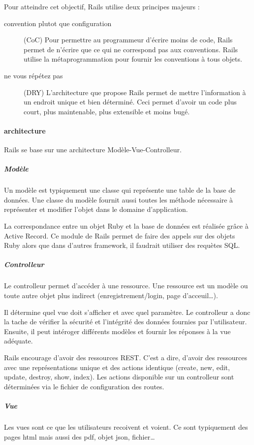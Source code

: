 Pour atteindre cet objectif, Rails utilise deux principes majeurs :
\begin{description}
  \item[convention plutot que configuration] (CoC) Pour permettre au programmeur d'écrire moins de code, Rails permet de n'écrire que ce qui ne correspond pas aux conventions. Rails utilise la métaprogrammation pour fournir les conventions à tous objets.
  \item[ne vous répétez  pas] (DRY) L'architecture que propose Rails permet de mettre l'information à un endroit unique et bien déterminé. Ceci permet d'avoir un code plus court, plus maintenable, plus extensible et moins bugé.
\end{description}

\paragraph{architecture}
Rails se base sur une architecture Modèle-Vue-Controlleur.
\subparagraph{Modèle} 
Un modèle est typiquement une classe qui représente une table de la base de données. Une classe du modèle fournit aussi toutes les méthode nécessaire à représenter et modifier l'objet dans le domaine d'application.

La correspondance entre un objet Ruby et la base de données est réalisée grâce à Active Record. Ce module de Rails permet de faire des appels sur des objets Ruby alors que dans d'autres framework, il faudrait utiliser des requètes SQL.
  
\subparagraph{Controlleur} 
Le controlleur permet d'accéder à une ressource. Une ressource est un modèle ou toute autre objet plus indirect (enregistrement/login, page d'acceuil\ldots).  

Il détermine quel vue doit s'afficher et avec quel paramètre. Le controlleur a donc la tache de vérifier la sécurité et l'intégrité des données fournies par l'utilisateur. Ensuite, il peut intéroger différents modèles et fournir les réponses à la vue adéquate. 

Rails encourage d'avoir des ressources REST. C'est a dire, d'avoir des ressources avec une représentations unique et des actions identique (create, new, edit, update, destroy, show, index). Les actions disponible sur un controlleur sont déterminées via le fichier de configuration des routes.

\subparagraph{Vue} 
Les vues sont ce que les utilisateurs recoivent et voient. Ce sont typiquement des pages html mais aussi des pdf, objet json, fichier\ldots 

